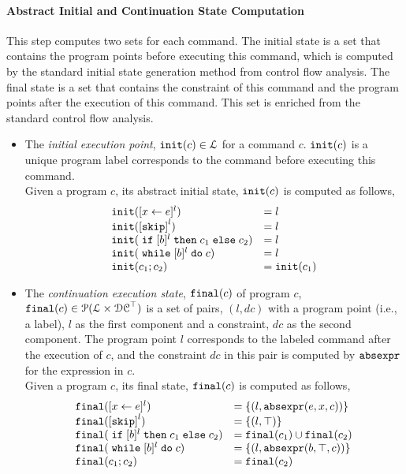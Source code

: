 \paragraph{Abstract Initial and Continuation State Computation}
This step computes two sets for each command. 
The initial state is a set that contains the
program points before executing this command, which is computed by the standard initial state generation method from control flow analysis.
The final state is a set
that contains the constraint of this command and the program points after the execution of this command.
This set is enriched 
from the standard control flow analysis.

%
\begin{itemize}
  \item The \emph{initial execution point}, $\mathtt{init}(c) \in \mathcal{L}$
  for a command $c$.
  $\mathtt{init}(c)$ is a unique program label corresponds to the command before executing this command. 
\\
Given a program $c$, its abstract initial state, $\mathtt{init}(c)$ is computed as follows,
%
\[
  \begin{array}{ll}
    \absinit(\clabel{\assign{x}{\expr}}{}^l)  & = l  \\
    \absinit(\clabel{\eskip}^{l})  & = l \\
    \absinit(\eif [b]^l \ethen c_1 \eelse c_2)  & = l \\
    \absinit(\ewhile [b]^l \edo c)  & = l \\
    \absinit(c_1 ; c_2)  & = \absinit(c_1) \\
 \end{array}
 \]
%
%
\item The \emph{continuation execution state}, $\mathtt{final}(c)$ of program $c$, 
$\mathtt{final}(c) \in \mathcal{P}(\mathcal{L} \times \mathcal{DC}^{\top})$
is a set of pairs, $(l, dc)$ with a
program point (i.e., a label), $l$ as the first component and a constraint, 
$dc$ as the second component.
The program point $l$ corresponds to the labeled command after the execution of $c$,
and the constraint $dc$ in this pair is computed by $\mathtt{abs}{\mathtt{expr}}$ for the expression in $c$.
\\
Given a program $c$, its final state, $\mathtt{final}(c)$ is computed as follows,
 \[
  \begin{array}{ll}
    \absfinal(\clabel{\assign{x}{\expr}}{}^l)  & = \{(l, \absexpr(\expr, x, c))\}  \\
     \absfinal(\clabel{\eskip}^{l})  
     & = \{(l, \top)\} \\
     \absfinal(\eif [b]^l \ethen c_1 \eelse c_2)  & = \absfinal(c_1) \cup \absfinal(c_2) \\
     \absfinal(\ewhile [b]^l \edo c)  & = \{(l, \absexpr(\bexpr, \top, c))\} \\
     \absfinal(c_1 ; c_2)  & =  \absfinal(c_2) \\
 \end{array}
 \]
\end{itemize}
